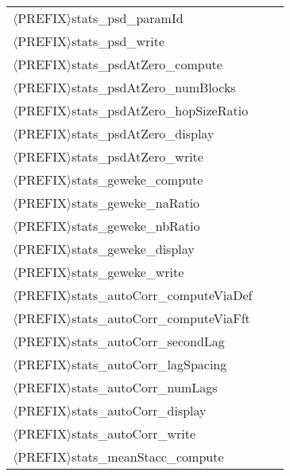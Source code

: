 \begin{table}[htpb]
\begin{center}
\begin{tabular}{l|c|c}
$\langle$PREFIX$\rangle$stats\_psd\_paramId               &         &             \\
$\langle$PREFIX$\rangle$stats\_psd\_write                 &         &             \\
\hline
$\langle$PREFIX$\rangle$stats\_psdAtZero\_compute         &         &             \\
$\langle$PREFIX$\rangle$stats\_psdAtZero\_numBlocks       &         &             \\
$\langle$PREFIX$\rangle$stats\_psdAtZero\_hopSizeRatio    &         &             \\
$\langle$PREFIX$\rangle$stats\_psdAtZero\_display         &         &             \\
$\langle$PREFIX$\rangle$stats\_psdAtZero\_write           &         &             \\
\hline
$\langle$PREFIX$\rangle$stats\_geweke\_compute            &         &             \\
$\langle$PREFIX$\rangle$stats\_geweke\_naRatio            &         &             \\
$\langle$PREFIX$\rangle$stats\_geweke\_nbRatio            &         &             \\
$\langle$PREFIX$\rangle$stats\_geweke\_display            &         &             \\
$\langle$PREFIX$\rangle$stats\_geweke\_write              &         &             \\
\hline
$\langle$PREFIX$\rangle$stats\_autoCorr\_computeViaDef    &         &             \\
$\langle$PREFIX$\rangle$stats\_autoCorr\_computeViaFft    &         &             \\
$\langle$PREFIX$\rangle$stats\_autoCorr\_secondLag        &         &             \\
$\langle$PREFIX$\rangle$stats\_autoCorr\_lagSpacing       &         &             \\
$\langle$PREFIX$\rangle$stats\_autoCorr\_numLags          &         &             \\
$\langle$PREFIX$\rangle$stats\_autoCorr\_display          &         &             \\
$\langle$PREFIX$\rangle$stats\_autoCorr\_write            &         &             \\
\hline
$\langle$PREFIX$\rangle$stats\_meanStacc\_compute         &         &             \\

\end{tabular}
\end{center}
\end{table}
